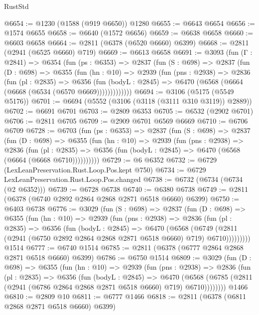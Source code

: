 \begin{lexlean}{RustStd}
\begin{coremodule}
{\begin{coremodule}
{{{{{{{{{{{{{{{@6654 := @1230 (@1588 (@919 @6650)) @1280
@6655 := @6643 @6654
@6656 := @1574 @6655
@6658 := @6640 (@1572 @6656)
@6659 := @6638 @6658
@6660 := @6603 @6658
@6664 := @2811 (@6378 (@6520 @6660) @6399)
@6668 := @2811 (@2941 (@6525 @6660) @719)
@6669 := @6613 @6658
@6691 := @3093
    (fun (Γ : @2841) =>
    @6354
      (fun (ps : @6353) =>
      @2837
        (fun (S : @698) =>
        @2837
          (fun (D : @698) =>
          @6355
            (fun (hn : @10) =>
            @2939
              (fun (pns : @2938) =>
              @2836
                (fun (pl : @2835) =>
                @6356
                  (fun (bodyL : @2845) =>
                  @6470 (@6568 (@6664 (@6668 (@6534 (@6570 @6669)))))))))))))
@6694 := @3106 (@5175 (@5549 @5176))
@6701 := @6694 (@5552 (@3106 (@3118 (@3111 @310 @3119)) @2889))
@6702 := @6691 @6701
@6703 := @2809 @6353
@6705 := @6532 (@2902 @6701)
@6706 := @2811 @6705
@6709 := @2909 @6701 @6569 @6669
@6710 := @6706 @6709
@6728 := @6703
    (fun (ps : @6353) =>
    @2837
      (fun (S : @698) =>
      @2837
        (fun (D : @698) =>
        @6355
          (fun (hn : @10) =>
          @2939
            (fun (pns : @2938) =>
            @2836
              (fun (pl : @2835) =>
              @6356 (fun (bodyL : @2845) => @6470 (@6568 (@6664 (@6668 @6710))))))))))
@6729 := @6 @6352
@6732 := @6729 (LexLeanPreservation.Rust.Loop.Pos.kept @750)
@6734 := @6729 LexLeanPreservation.Rust.Loop.Pos.changed
@6738 := @6732 (@6734 (@6734 (@2 @6352)))
@6739 := @6728 @6738
@6740 := @6380 @6738
@6749 := @2811 (@6378 (@6740 @2892 @2864 @2868 @2871 @6518 @6660) @6399)
@6750 := @6403 @6738
@6776 := @3029
    (fun (S : @698) =>
    @2837
      (fun (D : @698) =>
      @6355
        (fun (hn : @10) =>
        @2939
          (fun (pns : @2938) =>
          @2836
            (fun (pl : @2835) =>
            @6356
              (fun (bodyL : @2845) =>
              @6470
                (@6568
                  (@6749
                    (@2811 (@2941 (@6750 @2892 @2864 @2868 @2871 @6518 @6660) @719) @6710)))))))))
    @1514
@6777 := @6740 @1514
@6785 := @2811 (@6378 (@6777 @2864 @2868 @2871 @6518 @6660) @6399)
@6786 := @6750 @1514
@6809 := @3029
    (fun (D : @698) =>
    @6355
      (fun (hn : @10) =>
      @2939
        (fun (pns : @2938) =>
        @2836
          (fun (pl : @2835) =>
          @6356
            (fun (bodyL : @2845) =>
            @6470
              (@6568 (@6785 (@2811 (@2941 (@6786 @2864 @2868 @2871 @6518 @6660) @719) @6710))))))))
    @1466
@6810 := @2809 @10
@6811 := @6777 @1466
@6818 := @2811 (@6378 (@6811 @2868 @2871 @6518 @6660) @6399)
}}}}}}}}}}}}}}}
\end{coremodule}}
\end{coremodule}
\end{lexlean}
